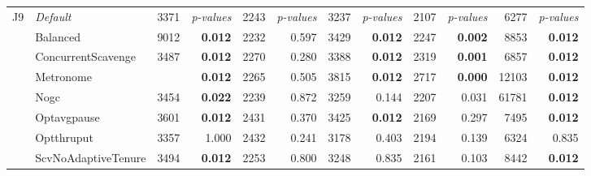 \begin{table*}
{\begin{tabular}{cl|rr|rr|rr|rr|rr}
			\hline
			\multirow{9}{*}{J9}
			    & \em Default         & 3371                    & \em p-values               & 2243                      & \em p-values           & 3237                      & \em p-values            & 2107                         & \em p-values                 & 6277                        & \em p-values       \\
			    & Balanced            & 9012                    & \bf 0.012                  & 2232                      & 0.597                  & 3429                      & \bf 0.012               & 2247                         & \bf 0.002                    & 8853                        & \bf 0.012          \\
			    & ConcurrentScavenge  & 3487                    & \bf 0.012                  & 2270                      & 0.280                  & 3388                      & \bf 0.012               & 2319                         & \bf 0.001                    & 6857                        & \bf 0.012          \\
			    & Metronome           & \best 2098              & \bf 0.012                & 2265                      & 0.505                  & 3815                      & \bf 0.012               & 2717                         & \bf 0.000                    & 12103                       & \bf 0.012              \\
			    & Nogc                & 3454                    & \bf 0.022                  & 2239                      & 0.872                  & 3259                      & 0.144                   & 2207                         & 0.031                        & 61781                       & \bf 0.012          \\
			    & Optavgpause         & 3601                    & \bf 0.012                  & 2431                      & 0.370                  & 3425                      & \bf 0.012               & 2169                         & 0.297                        & 7495                        & \bf 0.012          \\
			    & Optthruput          & 3357                    & 1.000                      & 2432                      & 0.241                  & 3178                      & 0.403                   & 2194                         & 0.139                        & 6324                        & 0.835              \\
			    & ScvNoAdaptiveTenure & 3494                    & \bf 0.012                  & 2253                      & 0.800                  & 3248                      & 0.835                   & 2161                         & 0.103                        & 8442                        & \bf 0.012          \\


\end{tabular}}
\end{table*}

